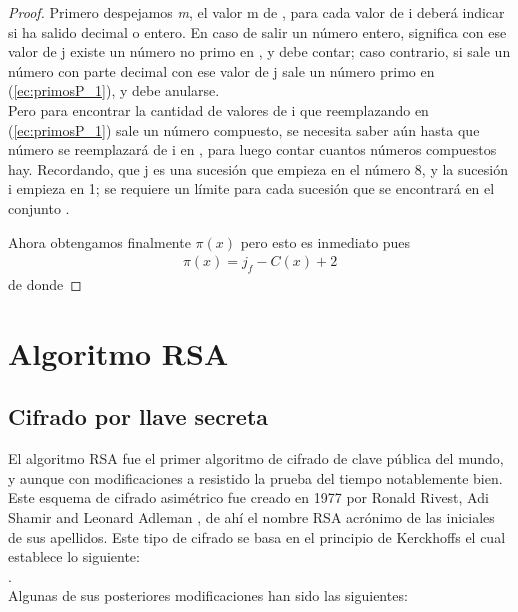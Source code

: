 \documentclass[10pt,letterpaper]{article}
\begin{document}
\begin{proof}
Primero despejamos \textit{m},  el valor m de  , para cada valor de i
deberá indicar si ha salido decimal o entero. En caso de salir 
un número entero, significa con ese valor de j existe un número 
no primo en , y debe contar; caso contrario, si sale un número 
con parte decimal con ese valor de j sale un número primo en 
(\ref{ec:primosP_1}), y debe anularse.
\\

Pero para encontrar la cantidad de valores de i que reemplazando 
en (\ref{ec:primosP_1}) sale un número compuesto, se necesita saber aún hasta 
que número se reemplazará de i en , para luego contar cuantos 
números compuestos hay. Recordando, que j es una sucesión que 
empieza en el número 8, y la sucesión i empieza en 1; se 
requiere un límite para cada sucesión que se encontrará en el 
conjunto  .


Ahora obtengamos finalmente $\pi(x)$ pero esto es inmediato
pues
\begin{align*}
	\pi(x) = j_f - C(x) + 2
\end{align*}
de donde
		
\end{proof}	
\section{Algoritmo RSA}
	\subsection{Cifrado por llave secreta}
	El algoritmo RSA fue el primer algoritmo de cifrado de clave pública del mundo, y aunque con modificaciones a resistido la prueba del tiempo notablemente bien. Este esquema de cifrado asimétrico fue creado en 1977 por  Ronald Rivest, Adi Shamir and Leonard
	Adleman , de ahí el nombre RSA acrónimo de las iniciales de  sus apellidos.
	Este tipo de cifrado se basa en el principio de Kerckhoffs el cual establece lo siguiente:\\ 
	.\\
	 Algunas de sus posteriores modificaciones  han sido las siguientes:
\end{document}
